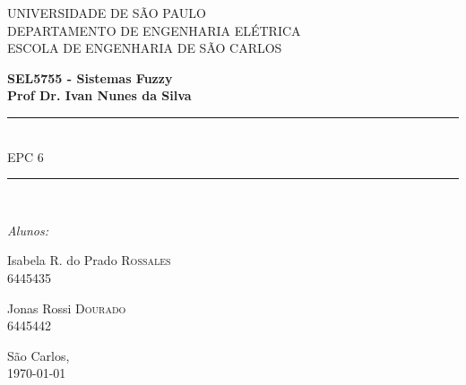 \documentclass{report}
\begin{document}
\newcommand{\HRule}{\rule{\linewidth}{0.5mm}}
\newcommand{\tsize}[1]{(\frac{W}{L})_{#1}}
 

\begin{titlepage}

\begin{center}


{\LARGE UNIVERSIDADE DE SÃO PAULO\\}
{\LARGE DEPARTAMENTO DE ENGENHARIA ELÉTRICA \\}
{\LARGE ESCOLA DE ENGENHARIA DE SÃO CARLOS\\[4cm]}

\textbf{\large SEL5755 - Sistemas Fuzzy}\\[1cm]
\textbf{\large Prof Dr. Ivan Nunes da Silva}\\[2cm]


\HRule \\[0.6cm]
{ \huge EPC 6\bfseries }\\[0.6cm]

\HRule \\[2cm]


\begin{center} \large
\emph{Alunos:}\\
\end{center}

\begin{minipage}{0.4\textwidth}
\begin{flushleft} \large
Isabela R. do Prado \textsc{Rossales}\\
6445435
\end{flushleft}
\end{minipage}
\begin{minipage}{0.4\textwidth}
\begin{flushright} \large
Jonas Rossi \textsc{Dourado}\\
6445442
\end{flushright}
\end{minipage}

\vfill

{\large São Carlos,\\ \today}

\end{center}

\end{titlepage}
\end{document}
